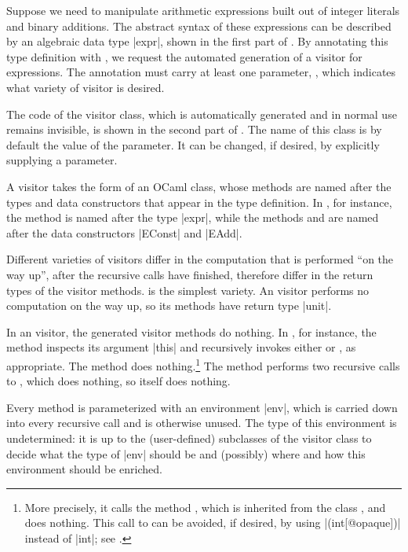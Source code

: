 \documentclass[11pt,a4paper,twoside]{article}
\begin{document}
Suppose we need to manipulate arithmetic expressions built out of integer
literals and binary additions. The abstract syntax of these expressions can be
described by an algebraic data type \oc|expr|, shown in the first part of
.
%
By annotating this type definition with \derivingvisitors, we request the
automated generation of a visitor for expressions. The annotation
\derivingvisitors must carry at least one parameter, \variety, which indicates
what variety of visitor is desired.

The code of the visitor class, which is automatically generated and in normal
use remains invisible, is shown in the second part of . The
name of this class is by default the value of the \variety parameter. It can
be changed, if desired, by explicitly supplying a \name parameter.

A visitor takes the form of an OCaml class, whose methods are named after the
types and data constructors that appear in the type definition. In
, for instance, the method  is named after
the type \oc|expr|, while the methods  and
 are named after the data constructors \oc|EConst| and
\oc|EAdd|.

Different varieties of visitors differ in the computation that is performed
``on the way up'', after the recursive calls have finished, therefore differ
in the return types of the visitor methods. \iter is the simplest variety. An
\iter visitor performs no computation on the way up, so its methods have
return type \oc|unit|.

In an \iter visitor, the generated visitor methods do nothing. In
, for instance, the method  inspects its
argument \oc|this| and recursively invokes either  or
, as appropriate. The method  does
nothing.\footnote{More precisely, it calls the method ,
  which is inherited from the class , and does
  nothing. This call to  can be avoided, if desired, by using
  \oc|(int[@opaque])| instead of \oc|int|; see .} The method
 performs two recursive calls to ,
which does nothing, so  itself does nothing.

Every method is parameterized with an environment \oc|env|, which is carried
down into every recursive call and is otherwise unused. The type of this
environment is undetermined: it is up to the (user-defined) subclasses of the
visitor class to decide what the type of \oc|env| should be and (possibly)
where and how this environment should be enriched.
\end{document}
